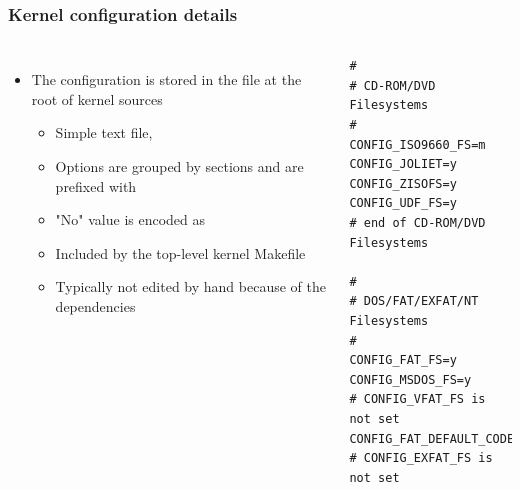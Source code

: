 \begin{frame}[fragile]
  \frametitle{Kernel configuration details}
  \begin{columns}
    \begin{itemize}
    \item The configuration is stored in the  file at the
      root of kernel sources
      \begin{itemize}
      \item Simple text file, 
      \item Options are grouped by sections and are prefixed with
      \item "No" value is encoded as 
      \item Included by the top-level kernel Makefile
      \item Typically not edited by hand because of the dependencies
      \end{itemize}
    \end{itemize}
    \footnotesize
\begin{verbatim}
#
# CD-ROM/DVD Filesystems
#
CONFIG_ISO9660_FS=m
CONFIG_JOLIET=y
CONFIG_ZISOFS=y
CONFIG_UDF_FS=y
# end of CD-ROM/DVD Filesystems

#
# DOS/FAT/EXFAT/NT Filesystems
#
CONFIG_FAT_FS=y
CONFIG_MSDOS_FS=y
# CONFIG_VFAT_FS is not set
CONFIG_FAT_DEFAULT_CODEPAGE=437
# CONFIG_EXFAT_FS is not set
\end{verbatim}
  \end{columns}
\end{frame}

